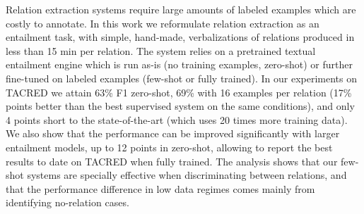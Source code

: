 Relation extraction systems require large amounts of labeled examples which are costly to annotate. In this work we reformulate relation extraction as an entailment task, with simple, hand-made, verbalizations of relations produced in less than 15 min per relation. The system relies on a pretrained textual entailment engine which is run as-is (no training examples, zero-shot) or further fine-tuned on labeled examples (few-shot or fully trained). In our experiments on TACRED we attain 63\% F1 zero-shot, 69\% with 16 examples per relation (17\% points better than the best supervised system on the same conditions), and only 4 points short to the state-of-the-art (which uses 20 times more training data). We also show that the performance can be improved significantly with larger entailment models, up to 12 points in zero-shot, allowing to report the best results to date on TACRED when fully trained. The analysis shows that our few-shot systems are specially effective when discriminating between relations, and that the performance difference in low data regimes comes mainly from identifying no-relation cases.
